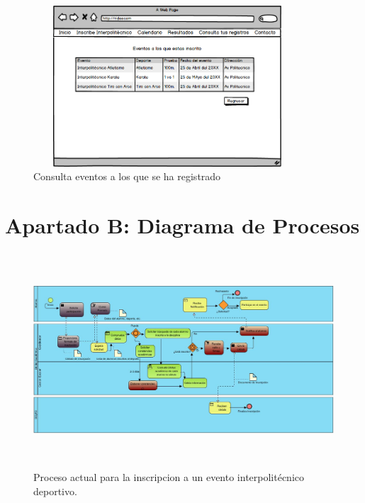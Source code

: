 		\begin{figure}[hbt!]
			\centering
			\includegraphics[width=10cm, height=6cm]{Imagenes/Disenos/p18ConsultaInscripciones.png}
			\caption{Consulta eventos a los que se ha registrado}
			\label{Consultainscripciones}
		\end{figure}

	\section{Apartado B: Diagrama de Procesos}	
		
		\begin{figure}[hbt!]
			\centering
			\includegraphics[width=16cm, height=8cm]{Imagenes/Disenos/ProcesoInscripcionActual.jpg}
			\caption{Proceso actual para la inscripcion a un evento interpolitécnico deportivo.}
			\label{ProcesoInscripcionActual}
		\end{figure}
	
